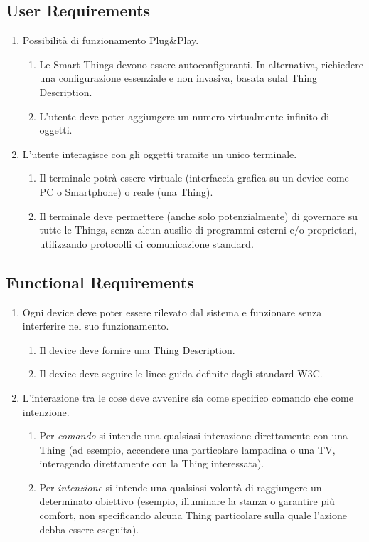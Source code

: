 \documentclass[12pt,a4paper,openright,oneside]{report}
\begin{document}
\subsection{User Requirements}
\begin{enumerate}
	\item Possibilità di funzionamento Plug\&Play.
	\begin{enumerate}[label*=\arabic*.]
		\item Le Smart Things devono essere autoconfiguranti. In alternativa, richiedere una configurazione essenziale e non invasiva, basata sulal Thing Description.
		\item L'utente deve poter aggiungere un numero virtualmente infinito di oggetti.
	\end{enumerate}
	
	\item L'utente interagisce con gli oggetti tramite un unico terminale.
	\begin{enumerate}[label*=\arabic*.]
		\item Il terminale potrà essere virtuale (interfaccia grafica su un device come PC o Smartphone) o reale (una Thing).
		\item Il terminale deve permettere (anche solo potenzialmente) di governare su tutte le Things, senza alcun ausilio di programmi esterni e/o proprietari, utilizzando protocolli di comunicazione standard.
	\end{enumerate}
\end{enumerate}

\subsection{Functional Requirements}
\begin{enumerate}
	\item Ogni device deve poter essere rilevato dal sistema e funzionare senza interferire nel suo funzionamento.
	\begin{enumerate}[label*=\arabic*.]
		\item Il device deve fornire una Thing Description.
		\item Il device deve seguire le linee guida definite dagli standard W3C.
	\end{enumerate}
	
	
	\item L'interazione tra le cose deve avvenire sia come specifico comando che come intenzione.
	\begin{enumerate}[label*=\arabic*.]
		\item Per \textit{comando} si intende una qualsiasi interazione direttamente con una Thing (ad esempio, accendere una particolare lampadina o una TV, interagendo direttamente con la Thing interessata).
		\item Per \textit{intenzione} si intende una qualsiasi volontà di raggiungere un determinato obiettivo (esempio, illuminare la stanza o garantire più comfort, non specificando alcuna Thing particolare sulla quale l'azione debba essere eseguita).
	\end{enumerate}
\end{enumerate}
\end{document}
